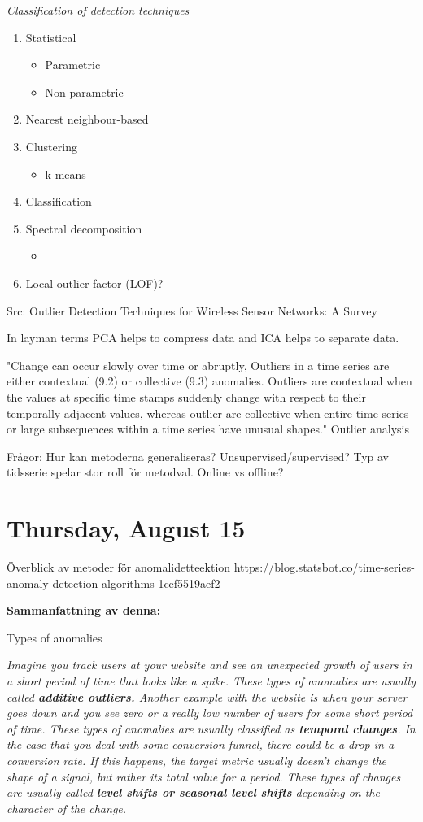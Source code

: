 \documentclass[11pt,letterpaper]{article}
\begin{document}
\textit{Classification of detection techniques}
\begin{enumerate}
\item Statistical
\begin{itemize}
\item Parametric
\item Non-parametric 
\end{itemize}
\item Nearest neighbour-based
\item Clustering
\begin{itemize}
\item k-means
\end{itemize}
\item Classification
\item Spectral decomposition
\begin{itemize}
\item 
\end{itemize}
\item Local outlier factor (LOF)?	
\end{enumerate}
Src: Outlier Detection Techniques for Wireless Sensor Networks: A Survey

In layman terms PCA helps to compress data and ICA helps to separate data.

"Change can occur slowly over time or abruptly, Outliers in a time series are either contextual (9.2) or collective (9.3) anomalies. Outliers are contextual when the values at specific time stamps suddenly change with respect to their temporally adjacent values, whereas outlier are collective when entire time series or large subsequences within a time series have unusual shapes." Outlier analysis 

Frågor:
Hur kan metoderna generaliseras?
Unsupervised/supervised?
Typ av tidsserie spelar stor roll för metodval. 
Online vs offline?

\section*{Thursday, August 15}
Överblick av metoder för anomalidetteektion 
https://blog.statsbot.co/time-series-anomaly-detection-algorithms-1cef5519aef2

\textbf{Sammanfattning av denna:}

Types of anomalies

\textit{Imagine you track users at your website and see an unexpected growth of users in a short period of time that looks like a spike. These types of anomalies are usually called \textbf{additive outliers.}
Another example with the website is when your server goes down and you see zero or a really low number of users for some short period of time. These types of anomalies are usually classified as \textbf{temporal changes}.
In the case that you deal with some conversion funnel, there could be a drop in a conversion rate. If this happens, the target metric usually doesn’t change the shape of a signal, but rather its total value for a period. These types of changes are usually called \textbf{level shifts or seasonal level shifts} depending on the character of the change.}
\end{document}
